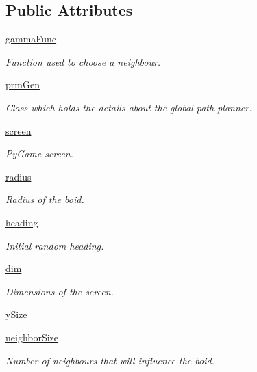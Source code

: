 \subsection*{Public Attributes}
\begin{DoxyCompactItemize}
\item 
\hyperlink{classboid_1_1Boid_abce5218cbba7b3d9f12dc78bbb9dab5e}{gamma\-Func}
\begin{DoxyCompactList}\small\item\em Function used to choose a neighbour. \end{DoxyCompactList}\item 
\hyperlink{classboid_1_1Boid_ac7d14690dde12ebc05f8f5ea80e29869}{prm\-Gen}
\begin{DoxyCompactList}\small\item\em Class which holds the details about the global path planner. \end{DoxyCompactList}\item 
\hyperlink{classboid_1_1Boid_aa230e5710394a620995a3943fc9faa8d}{screen}
\begin{DoxyCompactList}\small\item\em Py\-Game screen. \end{DoxyCompactList}\item 
\hyperlink{classboid_1_1Boid_a1bff2843c74b712aba274831d0a715d4}{radius}
\begin{DoxyCompactList}\small\item\em Radius of the boid. \end{DoxyCompactList}\item 
\hyperlink{classboid_1_1Boid_afc4b725b80313dc3604ac36015f84156}{heading}
\begin{DoxyCompactList}\small\item\em Initial random heading. \end{DoxyCompactList}\item 
\hyperlink{classboid_1_1Boid_a88a68e23e37b82bfe9862d7cd79542ad}{dim}
\begin{DoxyCompactList}\small\item\em Dimensions of the screen. \end{DoxyCompactList}\item 
\hyperlink{classboid_1_1Boid_a09f8fe6b2deb64fd65cfd64fc01470b9}{y\-Size}
\item 
\hyperlink{classboid_1_1Boid_a4af115e678f7716a2eb87c573e71073c}{neighbor\-Size}
\begin{DoxyCompactList}\small\item\em Number of neighbours that will influence the boid. \end{DoxyCompactList}\item 

\end{DoxyCompactItemize}
